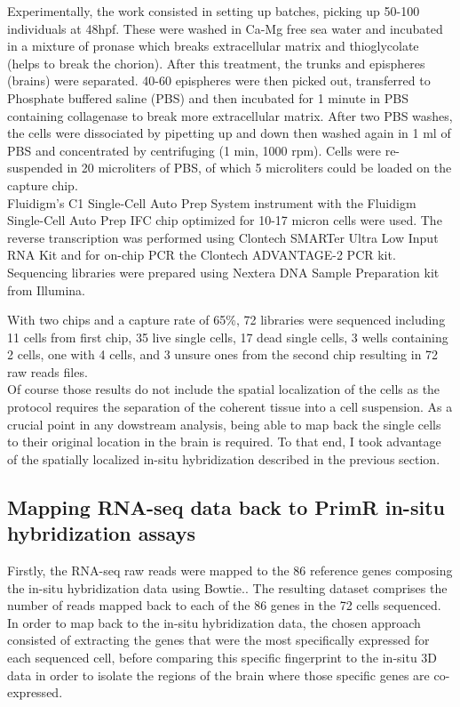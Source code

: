 	Experimentally, the work consisted in setting up \platy{} batches, picking up 50-100 individuals at 48hpf. These were washed in Ca-Mg free sea water and incubated in a mixture of pronase which breaks extracellular matrix and thioglycolate (helps to break the chorion). After this treatment, the trunks and epispheres (brains) were separated. 40-60 epispheres were then picked out, transferred to Phosphate buffered saline (PBS) and then incubated for 1 minute in PBS containing collagenase to break more extracellular matrix. After two PBS washes, the cells were dissociated by pipetting up and down then washed again in 1 ml of PBS and concentrated by centrifuging (1 min, 1000 rpm). Cells were re-suspended in 20 microliters of PBS, of which 5 microliters could be loaded on the capture chip.\\

	Fluidigm's C1 Single-Cell Auto Prep System instrument with the Fluidigm Single-Cell Auto Prep IFC chip optimized for 10-17 micron cells were used. The reverse transcription was performed using Clontech SMARTer Ultra Low Input RNA Kit and for on-chip PCR the Clontech ADVANTAGE-2 PCR kit. Sequencing libraries were prepared using Nextera DNA Sample Preparation kit from Illumina.\\
	

	With two chips and a capture rate of 65\%, 72 libraries were sequenced including 11 cells from first chip, 35 live single cells, 17 dead single cells, 3 wells containing 2 cells, one with 4 cells, and 3 unsure ones from the second chip resulting in 72 raw reads files.\\	
  	
	Of course those results do not include the spatial localization of the cells as the protocol requires the separation of the coherent tissue into a cell suspension. As a crucial point in any dowstream analysis, being able to map back the single cells to their original location in the brain is required. To that end, I took advantage of the spatially localized in-situ hybridization described in the previous section.\\

  \subsection{Mapping RNA-seq data back to PrimR in-situ hybridization assays}
  	Firstly, the RNA-seq raw reads were mapped to the 86 reference genes composing the in-situ hybridization data using Bowtie.. The resulting dataset comprises the number of reads mapped back to each of the 86 genes in the 72 cells sequenced. In order to map back to the in-situ hybridization data, the chosen approach consisted of extracting the genes that were the most specifically expressed for each sequenced cell, before comparing this specific fingerprint to the in-situ 3D data in order to isolate the regions of the brain where those specific genes are co-expressed.\\
  	
